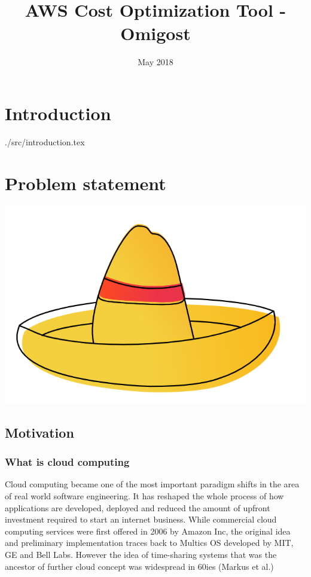 \documentclass[licencjacka,en]{thesisclass}
\title{AWS Cost Optimization Tool - Omigost}
\date{May 2018}
\begin{document}
\maketitle

\begin{abstract}
  
\end{abstract}

\tableofcontents

\chapter{Introduction}
{./src/introduction.tex}

\chapter{Problem statement}

\includegraphics[width=\textwidth*\real{0.4}]{imgs/sombrerro.png}

\section{Motivation}

\subsection{What is cloud computing}

Cloud computing became one of the most important paradigm shifts in the area of real world software engineering. It has reshaped the whole process of how applications are developed, deployed and reduced the amount of upfront investment required to start an internet business. While commercial cloud computing services were first offered in 2006 by Amazon Inc, the original idea and preliminary implementation traces back to Multics OS developed by MIT, GE and Bell Labs. However the idea of time-sharing systems that was the ancestor of further cloud concept was widespread in 60ies (Markus et al.)
\end{document}
